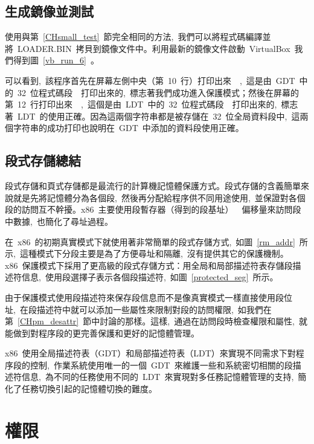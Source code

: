\subsection{生成鏡像並測試}

使用與第~\ref{CHsmall_test}~節完全相同的方法,~我們可以將程式碼編譯並將~LOADER.BIN~拷貝到鏡像文件中。利用最新的鏡像文件啟動~VirtualBox~我們得到圖~\ref{vb_run_6}~。


可以看到,~該程序首先在屏幕左側中央（第~10~行）打印出來~~,~這是由~GDT~中的~32~位程式碼段~~打印出來的,~標志著我們成功進入保護模式；然後在屏幕的第~12~行打印出來~~,~這個是由~LDT~中的~32~位程式碼段~~打印出來的,~標志著~LDT~的使用正確。因為這兩個字符串都是被存儲在~32~位全局資料段中,~這兩個字符串的成功打印也說明在~GDT~中添加的資料段使用正確。

\subsection{段式存儲總結}

段式存儲和頁式存儲都是最流行的計算機記憶體保護方式。段式存儲的含義簡單來說就是先將記憶體分為各個段,~然後再分配給程序供不同用途使用,~並保證對各個段的訪問互不幹擾。x86~主要使用段暫存器（得到的段基址）~\code{+}~偏移量來訪問段中數據,~也簡化了尋址過程。

在~x86~的初期真實模式下就使用著非常簡單的段式存儲方式,~如圖~\ref{rm_addr}~所示,~這種模式下分段主要是為了方便尋址和隔離,~沒有提供其它的保護機制。x86~保護模式下採用了更高級的段式存儲方式：用全局和局部描述符表存儲段描述符信息,~使用段選擇子表示各個段描述符,~如圖~\ref{protected_seg}~所示。

由于保護模式使用段描述符來保存段信息而不是像真實模式一樣直接使用段位址,~在段描述符中就可以添加一些屬性來限制對段的訪問權限,~如我們在第~\ref{CHpm_desattr}~節中討論的那樣。這樣,~通過在訪問段時檢查權限和屬性,~就能做到對程序段的更完善保護和更好的記憶體管理。

x86~使用全局描述符表（GDT）和局部描述符表（LDT）來實現不同需求下對程序段的控制,~作業系統使用唯一的一個~GDT~來維護一些和系統密切相關的段描述符信息,~為不同的任務使用不同的~LDT~來實現對多任務記憶體管理的支持,~簡化了任務切換引起的記憶體切換的難度。

\section{權限}

